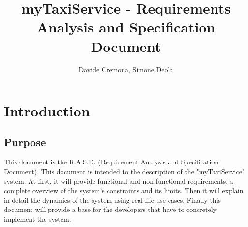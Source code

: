 \documentclass{report}
\begin{document}
\title{myTaxiService - Requirements Analysis and Specification Document}
\author{Davide Cremona, Simone Deola}
\maketitle

\tableofcontents

\chapter{Introduction}
\section{Purpose}
This document is the R.A.S.D. (Requirement Analysis and Specification Document).
This document is intended to the description of the "myTaxiService" system. 
At first, it will provide functional and non-functional requirements, a complete overview of the system's constraints and its limits. Then it will explain in detail the dynamics of the system using real-life use cases.
Finally this document will provide a base for the developers that have to concretely implement the system.
\end{document}

